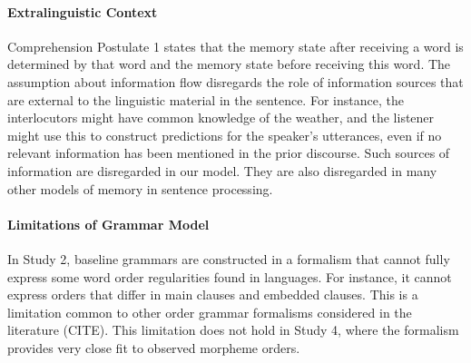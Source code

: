 \paragraph{Extralinguistic Context}
Comprehension Postulate 1 states that the memory state after receiving a word is determined by that word and the memory state before receiving this word.
The assumption about information flow disregards the role of information sources that are external to the linguistic material in the sentence.
For instance, the interlocutors might have common knowledge of the weather, and the listener might use this to construct predictions for the speaker's utterances, even if no relevant information has been mentioned in the prior discourse.
Such sources of information are disregarded in our model.
They are also disregarded in many other models of memory in sentence processing.


\paragraph{Limitations of Grammar Model}
In Study 2, baseline grammars are constructed in a formalism that cannot fully express some word order regularities found in languages.
For instance, it cannot express orders that differ in main clauses and embedded clauses.
This is a limitation common to other order grammar formalisms considered in the literature (CITE).
This limitation does not hold in Study 4, where the formalism provides very close fit to observed morpheme orders.



